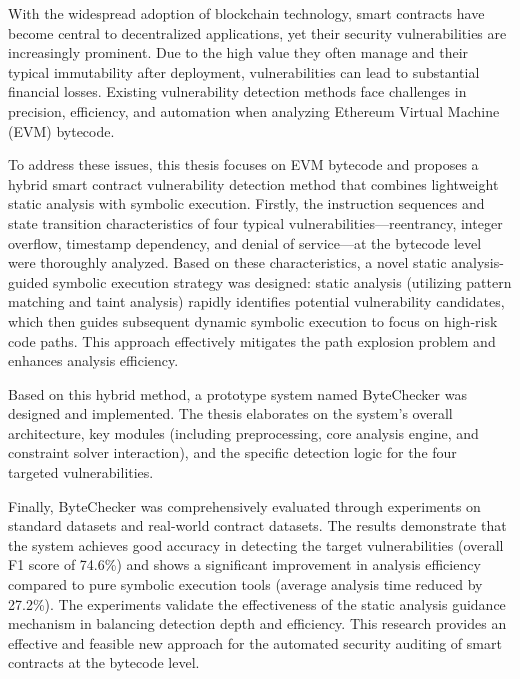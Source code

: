 \documentclass[print, master, vlined, timesmath]{DissertUESTC}
\begin{document}


\enabstract
With the widespread adoption of blockchain technology, smart contracts have become central to decentralized applications, yet their security vulnerabilities are increasingly prominent. Due to the high value they often manage and their typical immutability after deployment, vulnerabilities can lead to substantial financial losses. Existing vulnerability detection methods face challenges in precision, efficiency, and automation when analyzing Ethereum Virtual Machine (EVM) bytecode.

To address these issues, this thesis focuses on EVM bytecode and proposes a hybrid smart contract vulnerability detection method that combines lightweight static analysis with symbolic execution. Firstly, the instruction sequences and state transition characteristics of four typical vulnerabilities—reentrancy, integer overflow, timestamp dependency, and denial of service—at the bytecode level were thoroughly analyzed. Based on these characteristics, a novel static analysis-guided symbolic execution strategy was designed: static analysis (utilizing pattern matching and taint analysis) rapidly identifies potential vulnerability candidates, which then guides subsequent dynamic symbolic execution to focus on high-risk code paths. This approach effectively mitigates the path explosion problem and enhances analysis efficiency.

Based on this hybrid method, a prototype system named ByteChecker was designed and implemented. The thesis elaborates on the system's overall architecture, key modules (including preprocessing, core analysis engine, and constraint solver interaction), and the specific detection logic for the four targeted vulnerabilities.

Finally, ByteChecker was comprehensively evaluated through experiments on standard datasets and real-world contract datasets. The results demonstrate that the system achieves good accuracy in detecting the target vulnerabilities (overall F1 score of 74.6\%) and shows a significant improvement in analysis efficiency compared to pure symbolic execution tools (average analysis time reduced by 27.2\%). The experiments validate the effectiveness of the static analysis guidance mechanism in balancing detection depth and efficiency. This research provides an effective and feasible new approach for the automated security auditing of smart contracts at the bytecode level.
\end{document}
